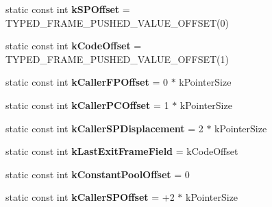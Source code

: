 \begin{DoxyCompactItemize}
\item 
static const int {\bfseries k\+S\+P\+Offset} = T\+Y\+P\+E\+D\+\_\+\+F\+R\+A\+M\+E\+\_\+\+P\+U\+S\+H\+E\+D\+\_\+\+V\+A\+L\+U\+E\+\_\+\+O\+F\+F\+S\+ET(0)\hypertarget{classv8_1_1internal_1_1_exit_frame_constants_a446aec18da43b589ab67c9a5868a5fc2}{}\label{classv8_1_1internal_1_1_exit_frame_constants_a446aec18da43b589ab67c9a5868a5fc2}

\item 
static const int {\bfseries k\+Code\+Offset} = T\+Y\+P\+E\+D\+\_\+\+F\+R\+A\+M\+E\+\_\+\+P\+U\+S\+H\+E\+D\+\_\+\+V\+A\+L\+U\+E\+\_\+\+O\+F\+F\+S\+ET(1)\hypertarget{classv8_1_1internal_1_1_exit_frame_constants_ada850362988be603e0274caf65cf18a4}{}\label{classv8_1_1internal_1_1_exit_frame_constants_ada850362988be603e0274caf65cf18a4}

\item 
static const int {\bfseries k\+Caller\+F\+P\+Offset} = 0 $\ast$ k\+Pointer\+Size\hypertarget{classv8_1_1internal_1_1_exit_frame_constants_af5e76bbbb8dacf85e60251f3c880b949}{}\label{classv8_1_1internal_1_1_exit_frame_constants_af5e76bbbb8dacf85e60251f3c880b949}

\item 
static const int {\bfseries k\+Caller\+P\+C\+Offset} = 1 $\ast$ k\+Pointer\+Size\hypertarget{classv8_1_1internal_1_1_exit_frame_constants_a5b45934040f1fea6f2278d393ff844ef}{}\label{classv8_1_1internal_1_1_exit_frame_constants_a5b45934040f1fea6f2278d393ff844ef}

\item 
static const int {\bfseries k\+Caller\+S\+P\+Displacement} = 2 $\ast$ k\+Pointer\+Size\hypertarget{classv8_1_1internal_1_1_exit_frame_constants_a51aa44479d92d7dd6b95530612dd46f5}{}\label{classv8_1_1internal_1_1_exit_frame_constants_a51aa44479d92d7dd6b95530612dd46f5}

\item 
static const int {\bfseries k\+Last\+Exit\+Frame\+Field} = k\+Code\+Offset\hypertarget{classv8_1_1internal_1_1_exit_frame_constants_a8af1bdbd041e67546ccfac97cf241c2f}{}\label{classv8_1_1internal_1_1_exit_frame_constants_a8af1bdbd041e67546ccfac97cf241c2f}

\item 
static const int {\bfseries k\+Constant\+Pool\+Offset} = 0\hypertarget{classv8_1_1internal_1_1_exit_frame_constants_aea288501943ab66b0a39f6cda1480742}{}\label{classv8_1_1internal_1_1_exit_frame_constants_aea288501943ab66b0a39f6cda1480742}

\item 
static const int {\bfseries k\+Caller\+S\+P\+Offset} = +2 $\ast$ k\+Pointer\+Size\hypertarget{classv8_1_1internal_1_1_exit_frame_constants_a068dd25a829684672bc946b3a767df01}{}\label{classv8_1_1internal_1_1_exit_frame_constants_a068dd25a829684672bc946b3a767df01}

\end{DoxyCompactItemize}


